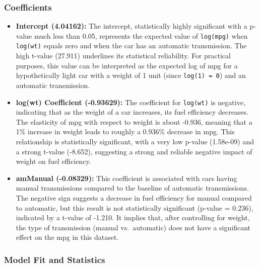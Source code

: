 \documentclass[
  letterpaper,
  DIV=11,
  numbers=noendperiod]{scrreport}
\begin{document}
\subsubsection{Coefficients}\label{coefficients-1}

\begin{itemize}
\item
  \textbf{Intercept (4.04162):} The intercept, statistically highly
  significant with a p-value much less than 0.05, represents the
  expected value of \texttt{log(mpg)} when \texttt{log(wt)} equals zero
  and when the car has an automatic transmission. The high t-value
  (27.911) underlines its statistical reliability. For practical
  purposes, this value can be interpreted as the expected log of mpg for
  a hypothetically light car with a weight of 1 unit (since
  \texttt{log(1)\ =\ 0}) and an automatic transmission.
\item
  \textbf{log(wt) Coefficient (-0.93629):} The coefficient for
  \texttt{log(wt)} is negative, indicating that as the weight of a car
  increases, its fuel efficiency decreases. The elasticity of mpg with
  respect to weight is about -0.936, meaning that a 1\% increase in
  weight leads to roughly a 0.936\% decrease in mpg. This relationship
  is statistically significant, with a very low p-value (1.58e-09) and a
  strong t-value (-8.652), suggesting a strong and reliable negative
  impact of weight on fuel efficiency.
\item
  \textbf{amManual (-0.08329):} This coefficient is associated with cars
  having manual transmissions compared to the baseline of automatic
  transmissions. The negative sign suggests a decrease in fuel
  efficiency for manual compared to automatic, but this result is not
  statistically significant (p-value = 0.236), indicated by a t-value of
  -1.210. It implies that, after controlling for weight, the type of
  transmission (manual vs.~automatic) does not have a significant effect
  on the mpg in this dataset.
\end{itemize}

\subsubsection{Model Fit and Statistics}\label{model-fit-and-statistics}
\end{document}

